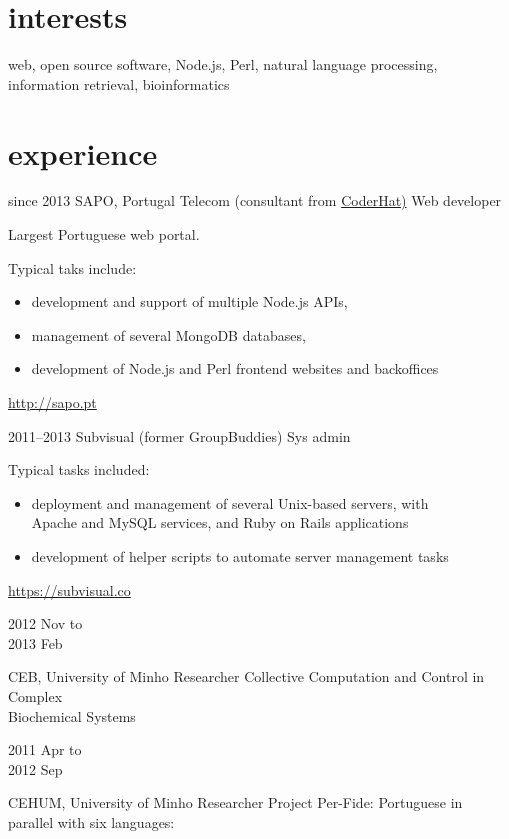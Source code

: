 \documentclass[a4paper]{friggeri-cv}
\begin{document}
\section{interests}

{\large{web, open source software, Node.js, Perl, natural language
processing, information retrieval, bioinformatics}}

\section{experience}
\begin{entrylist}
  \entry
    {{\footnotesize since} 2013}
    {SAPO, Portugal Telecom (consultant from \href{http://www.coderhat.com/}{CoderHat)}}
    {Web developer}
    {Largest Portuguese web portal. \footnotesize{Typical taks include:
        \begin{itemize}
            \item development and support of multiple Node.js APIs,
            \item management of several MongoDB databases,
            \item development of Node.js and Perl frontend websites and backoffices
        \end{itemize}
        \url{http://sapo.pt}
        }
    }
  \entry
    {2011--2013}
    {Subvisual (former GroupBuddies)}
    {Sys admin}
    {
    \footnotesize{Typical tasks included:
        \begin{itemize}
            \item deployment and management of several Unix-based
            servers, with\\
            Apache and MySQL services, and Ruby on Rails applications
            \item development of helper scripts to automate
            server management tasks
            \end{itemize}
        \url{https://subvisual.co}
        }
    }
  \entry
    {\parbox[t][][t]{1.8cm}{2012 {\footnotesize Nov to}\\2013 {\footnotesize Feb}}}
    {CEB, University of Minho}
    {Researcher}
    {Collective Computation and Control in Complex\\
    Biochemical Systems}
  \entry
    {\parbox[t][][t]{1.8cm}{2011 {\footnotesize Apr to}\\2012 {\footnotesize Sep}}}
    {CEHUM, University of Minho}
    {Researcher}
    {Project Per-Fide: Portuguese in parallel with six languages:\\
}
\end{entrylist}
\end{document}
